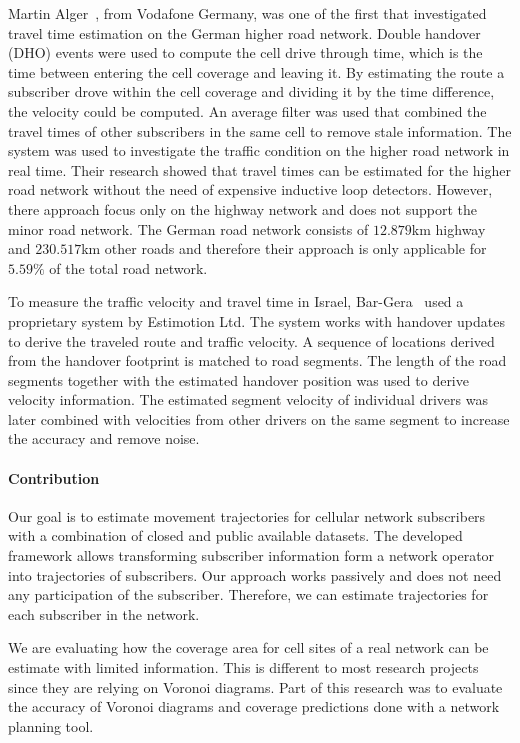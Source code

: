 \documentclass[twocolumn]{bmcart}%
\begin{document}
Martin Alger~\cite{Alger2004}, from Vodafone Germany, was one of the first that investigated travel time estimation on the German higher road network. Double handover (DHO) events were used to compute the cell drive through time, which is the time between entering the cell coverage and leaving it. By estimating the route a subscriber drove within the cell coverage and dividing it by the time difference, the velocity could be computed. An average filter was used that combined the travel times of other subscribers in the same cell to remove stale information. The system was used to investigate the traffic condition on the higher road network in real time. Their research showed that travel times can be estimated for the higher road network without the need of expensive inductive loop detectors. However, there approach focus only on the highway network and does not support the minor road network. The German road network consists of $12.879$km highway and $230.517$km other roads and therefore their approach is only applicable for $5.59\%$ of the total road network.\newline

To measure the traffic velocity and travel time in Israel, Bar-Gera~\cite{Bar2007} used a proprietary system by Estimotion Ltd. The system works with handover updates to derive the traveled route and traffic velocity. A sequence of locations derived from the handover footprint is matched to road segments. The length of the road segments together with the estimated handover position was used to derive velocity information. The estimated segment velocity of individual drivers was later combined with velocities from other drivers on the same segment to increase the accuracy and remove noise.

\paragraph*{Contribution}
Our goal is to estimate movement trajectories for cellular network subscribers with a combination of closed and public available datasets. The developed framework allows transforming subscriber information form a network operator into trajectories of subscribers. Our approach works passively and does not need any participation of the subscriber. Therefore, we can estimate trajectories for each subscriber in the network.

We are evaluating how the coverage area for cell sites of a real network can be estimate with limited information. This is different to most research projects~\cite{Gonzalez2008,Tettamanti2012} since they are relying on Voronoi diagrams. Part of this research was to evaluate the accuracy of Voronoi diagrams and coverage predictions done with a network planning tool.
\end{document}
